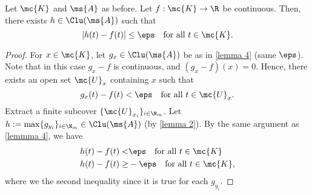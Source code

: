 \begin{lemma}
    Let \(\mc{K}\) and \(\ms{A}\) as before. Let \(f:\mc{K}\to\R\) be continuous. Then, there exists \(h\in\Clu(\ms{A})\) such that 
    \begin{equation*} 
        |h(t)-f(t)|\leq\eps\quad\text{for all}~t\in\mc{K}.
    \end{equation*}\label{lemma 5}
\end{lemma}
\begin{proof}
    For \(x\in\mc{K}\), let \(g_x\in\Clu(\ms{A})\) be as in \cref{lemma 4} (same \(\eps\)). Note that in this case \(g_x-f\) is continuous, and \((g_x-f)(x)=0\).  Hence, there exists an open set \(\mc{U}_x\) containing \(x\) such that
    \begin{equation*} 
        g_x(t)-f(t)<\eps\quad\text{for all}~t\in\mc{U}_x.
    \end{equation*}
    Extract a finite subcover \(\{\mc{U}_{x_i}\}_{i\in\N_m}\). Let \(h:=\max\{g_{y_i}\}_{i\in\N_m}\in\Clu(\ms{A})\) (by \cref{lemma 2}). By the same argument as \cref{lemmma 4}, we have 
    \begin{align*} 
        h(t)-f(t)<&\eps\quad\text{for all}~t\in\mc{K}\\
        h(t)-f(t)\geq&-\eps\quad\text{for all}~t\in\mc{K},
    \end{align*}
    where we the second inequality since it is true for each \(g_{y_i}\).
\end{proof}

